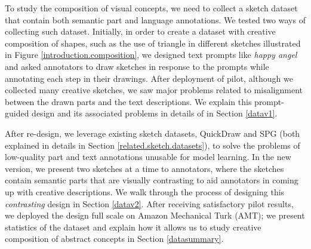 To study the composition of visual concepts, we need to collect a sketch dataset that contain both semantic part and language annotations. We tested two ways of collecting such dataset. Initially, in order to create a dataset with creative composition of shapes, such as the use of triangle in different sketches illustrated in Figure \ref{introduction.composition}, we designed text prompts like \textit{happy angel} and asked annotators to draw sketches in response to the prompts while annotating each step in their drawings.  
After deployment of pilot, although we collected many creative sketches, we saw major problems related to misalignment between the drawn parts and the text descriptions. We explain this prompt-guided design and its associated problems in details of in Section \ref{datav1}.    

After re-design, we leverage existing sketch datasets, QuickDraw and SPG (both explained in details in Section \ref{related.sketch.datasets}), to solve the problems of low-quality part and text annotations unusable for model learning.    
In the new version, we present two sketches at a time to annotators, where the sketches contain semantic parts that are visually contrasting to aid annotators in coming up with creative descriptions. We walk through the process of designing this \textit{contrasting} design in Section \ref{datav2}. After receiving satisfactory pilot results, we deployed the design full scale on Amazon Mechanical Turk (AMT); we present statistics of the dataset and explain how it allows us to study creative composition of abstract concepts in Section \ref{datasummary}. 


